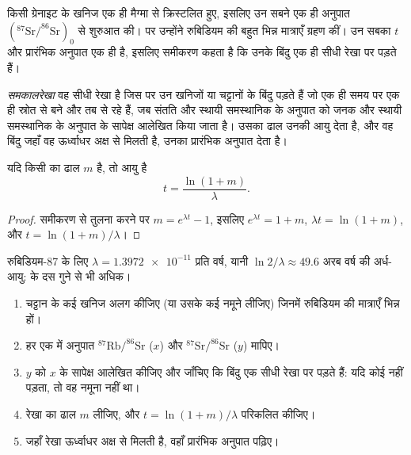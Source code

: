किसी ग्रेनाइट के खनिज एक ही मैग्मा से क्रिस्टलित हुए, इसलिए उन सबने
एक ही अनुपात $(^{87}\mathrm{Sr}/^{86}\mathrm{Sr})_0$ से शुरुआत की। पर उन्होंने
रुबिडियम की बहुत भिन्न मात्राएँ ग्रहण कीं। उन सबका $t$ और प्रारंभिक अनुपात एक ही है, इसलिए
समीकरण कहता है कि उनके बिंदु एक ही सीधी रेखा पर पड़ते हैं।

\begin{definition}[समकालरेखा]\label{def:g12:age-of-the-earth:isochron}
\emph{समकालरेखा} वह सीधी रेखा है जिस पर उन
खनिजों या चट्टानों के बिंदु पड़ते हैं जो एक ही समय पर एक ही
स्रोत से बने और तब से  रहे हैं, जब संतति और
स्थायी समस्थानिक के अनुपात को जनक और स्थायी समस्थानिक के अनुपात के सापेक्ष आलेखित किया जाता है। उसका
ढाल उनकी आयु देता है, और वह बिंदु जहाँ वह ऊर्ध्वाधर अक्ष से मिलती है,
उनका प्रारंभिक अनुपात देता है।
\end{definition}

\begin{proposition}[ढाल से आयु]\label{prop:g12:age-of-the-earth:slope}
यदि किसी  का ढाल $m$ है, तो आयु है
\[
  t = \frac{\ln(1+m)}{\lambda}.
\]
\end{proposition}

\begin{proof}
 समीकरण से तुलना करने पर $m = e^{\lambda t} - 1$, इसलिए
$e^{\lambda t} = 1 + m$, $\lambda t = \ln(1+m)$, और $t = \ln(1+m)/\lambda$।
\end{proof}

रुबिडियम-87 के लिए $\lambda = \num{1.3972e-11}$ प्रति वर्ष, यानी
$\ln 2/\lambda \approx 49.6$ अरब वर्ष की अर्ध-आयु:  के दस गुने से
भी अधिक।

\begin{method}[समकालरेखा से किसी चट्टान का काल-निर्धारण]\label{met:g12:age-of-the-earth:isochron}
\begin{enumerate}
  \item चट्टान के कई खनिज अलग कीजिए (या उसके कई नमूने
        लीजिए) जिनमें रुबिडियम की मात्राएँ भिन्न हों।
  \item हर एक में अनुपात $^{87}\mathrm{Rb}/^{86}\mathrm{Sr}$ ($x$)
        और $^{87}\mathrm{Sr}/^{86}\mathrm{Sr}$ ($y$) मापिए।
  \item $y$ को $x$ के सापेक्ष आलेखित कीजिए और जाँचिए कि बिंदु एक सीधी
        रेखा पर पड़ते हैं: यदि कोई नहीं पड़ता, तो वह नमूना  नहीं था।
  \item रेखा का ढाल $m$ लीजिए, और $t = \ln(1+m)/\lambda$ परिकलित कीजिए।
  \item जहाँ रेखा ऊर्ध्वाधर अक्ष से मिलती है, वहाँ प्रारंभिक अनुपात पढ़िए।
\end{enumerate}
\end{method}


